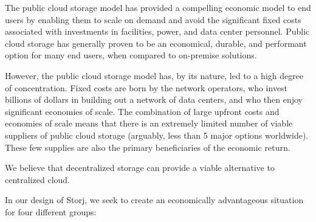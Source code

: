\documentclass[11pt,fleqn,openany]{book}
\begin{document}
The public cloud storage model has provided a compelling economic model to end
users by enabling them to scale on demand and avoid the significant fixed
costs associated with investments in facilities, power, and data center
personnel. Public cloud storage has generally proven to be an economical,
durable, and performant option for many end users, when compared to
on-premise solutions.

However, the public cloud storage model has, by its nature, led to a high
degree of concentration. Fixed costs are born by the network operators, who
invest billions of dollars in building out a network of data centers, and who
then enjoy significant economies of scale. The combination of large upfront
costs and economies of scale means that there is an extremely limited number
of viable suppliers of public cloud storage (arguably, less than 5 major
options worldwide). These few supplies are also the primary beneficiaries of
the economic return.

We believe that decentralized storage can provide a viable alternative to
centralized cloud.

In our design of Storj, we seek to create an economically advantageous
situation for four different groups:
\end{document}
